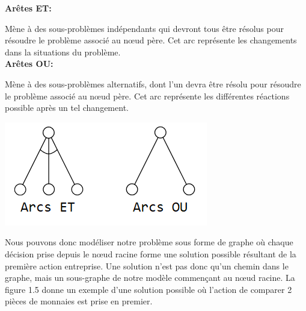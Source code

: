 {\setlength{\parindent}{0cm}\textbf{Arêtes ET:}}

Mène à des sous-problèmes indépendants qui devront tous être résolus pour résoudre le problème associé au nœud père. Cet arc représente les changements dans la situations du problème.\\

{\setlength{\parindent}{0cm}\textbf{Arêtes OU:}}

Mène à des sous-problèmes alternatifs, dont l'un devra être résolu pour résoudre le problème associé au nœud père. Cet arc représente les différentes réactions possible après un tel changement.

\begin{center}
    \includegraphics[scale=0.8]{../ressources/images/ET_OU_arcs.png}
\end{center}

Nous pouvons donc modéliser notre problème sous forme de graphe où chaque décision prise depuis le nœud racine forme une solution possible résultant de la première action entreprise. Une solution n'est pas donc qu'un chemin dans le graphe, mais un sous-graphe de notre modèle commençant au nœud racine. La figure 1.5 donne un exemple d'une solution possible où l'action de comparer 2 pièces de monnaies est prise en premier.

